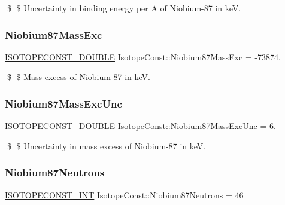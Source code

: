 \$ \$ Uncertainty in binding energy per A of Niobium-\/87 in keV. \mbox{\label{group___isotope_const-_niobium-_nb87_ga053c38d20f271a2eec825c45e2077183}} 
\subsubsection{\texorpdfstring{Niobium87\+Mass\+Exc}{Niobium87MassExc}}
{\footnotesize\ttfamily \mbox{\hyperlink{group___isotope_const-_macros_ga8f45a7272ce02c0b4c65c44636ed719a}{I\+S\+O\+T\+O\+P\+E\+C\+O\+N\+S\+T\+\_\+\+D\+O\+U\+B\+LE}} Isotope\+Const\+::\+Niobium87\+Mass\+Exc = -\/73874.}

\$ \$ Mass excess of Niobium-\/87 in keV. \mbox{\label{group___isotope_const-_niobium-_nb87_gabed34d0174f5406c40518a3c0a99b4de}} 
\subsubsection{\texorpdfstring{Niobium87\+Mass\+Exc\+Unc}{Niobium87MassExcUnc}}
{\footnotesize\ttfamily \mbox{\hyperlink{group___isotope_const-_macros_ga8f45a7272ce02c0b4c65c44636ed719a}{I\+S\+O\+T\+O\+P\+E\+C\+O\+N\+S\+T\+\_\+\+D\+O\+U\+B\+LE}} Isotope\+Const\+::\+Niobium87\+Mass\+Exc\+Unc = 6.}

\$ \$ Uncertainty in mass excess of Niobium-\/87 in keV. \mbox{\label{group___isotope_const-_niobium-_nb87_gac9b193888b55d8d374b01e962b91ea01}} 
\subsubsection{\texorpdfstring{Niobium87\+Neutrons}{Niobium87Neutrons}}
{\footnotesize\ttfamily \mbox{\hyperlink{group___isotope_const-_macros_ga5f18360b3e99483a35c32d789e62621c}{I\+S\+O\+T\+O\+P\+E\+C\+O\+N\+S\+T\+\_\+\+I\+NT}} Isotope\+Const\+::\+Niobium87\+Neutrons = 46}

